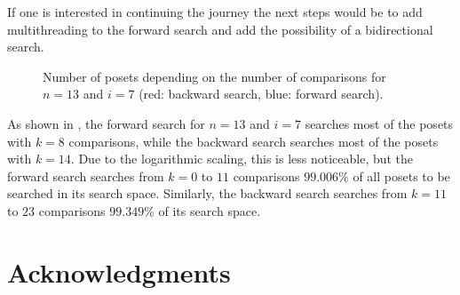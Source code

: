 \documentclass[twoside,leqno,twocolumn]{article}
\begin{document}
If one is interested in continuing the journey the next steps would be to add multithreading to the forward search and add the possibility of a bidirectional search.

\begin{figure}[!b]
  \centering
  
  \caption{Number of posets depending on the number of comparisons for $n = 13$ and $i = 7$ (red: backward search, blue: forward search).}
  \label{fig:backward_forward_count_13_6}
\end{figure}

As shown in , the forward search for $n = 13$ and $i = 7$ searches most of the posets with $k = 8$ comparisons, while the backward search searches most of the posets with $k = 14$.
Due to the logarithmic scaling, this is less noticeable, but the forward search searches from $k = 0$ to $11$ comparisons $99.006\%$ of all posets to be searched in its search space.
Similarly, the backward search searches from $k = 11$ to $23$ comparisons $99.349\%$ of its search space.


\section*{Acknowledgments}


\end{document}
